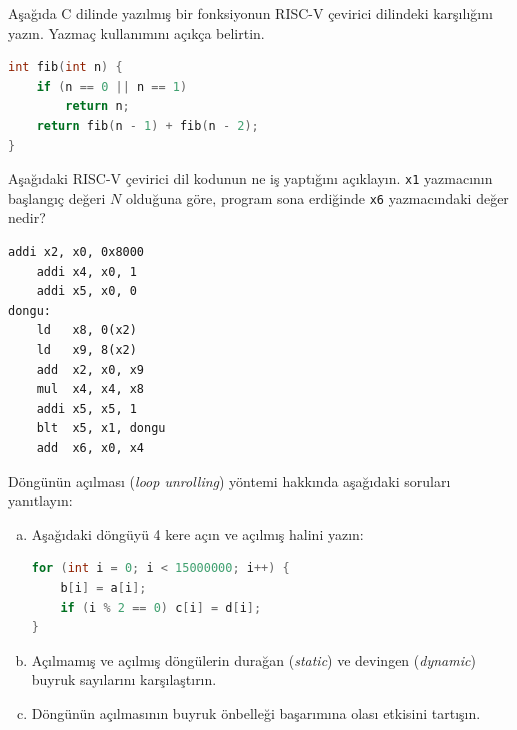 \begin{alistirma}[\zor]
Aşağıda C dilinde yazılmış bir fonksiyonun RISC-V çevirici dilindeki karşılığını yazın. Yazmaç kullanımını açıkça belirtin.
\begin{lstlisting}[language=C, style=alistirma-kod]
int fib(int n) {
    if (n == 0 || n == 1)
        return n;
    return fib(n - 1) + fib(n - 2);
}
\end{lstlisting}
\end{alistirma}

\begin{alistirma}[\zor]
Aşağıdaki RISC-V çevirici dil kodunun ne iş yaptığını açıklayın. \texttt{x1} yazmacının başlangıç değeri $N$ olduğuna göre, program sona erdiğinde \texttt{x6} yazmacındaki değer nedir?
\begin{lstlisting}[style=riscv, style=alistirma-kod]
    addi x2, x0, 0x8000
    addi x4, x0, 1
    addi x5, x0, 0
dongu:
    ld   x8, 0(x2)
    ld   x9, 8(x2)
    add  x2, x0, x9
    mul  x4, x4, x8
    addi x5, x5, 1
    blt  x5, x1, dongu
    add  x6, x0, x4
\end{lstlisting}
\end{alistirma}

\begin{alistirma}[\zor]
Döngünün açılması (\emph{loop unrolling}) yöntemi hakkında aşağıdaki soruları yanıtlayın:
\begin{enumerate}[(a)]
    \item Aşağıdaki döngüyü 4 kere açın ve açılmış halini yazın:
\begin{lstlisting}[language=C, style=alistirma-kod]
for (int i = 0; i < 15000000; i++) {
    b[i] = a[i];
    if (i % 2 == 0) c[i] = d[i];
}
\end{lstlisting}
    \item Açılmamış ve açılmış döngülerin durağan (\emph{static}) ve devingen (\emph{dynamic}) buyruk sayılarını karşılaştırın.
    \item Döngünün açılmasının buyruk önbelleği başarımına olası etkisini tartışın.
\end{enumerate}
\end{alistirma}

